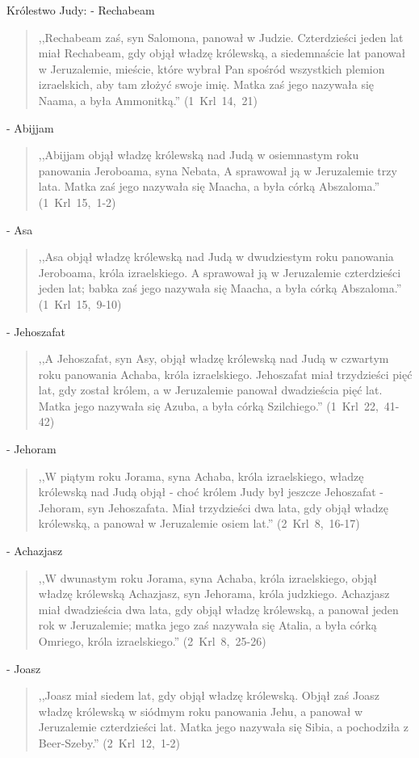 \documentclass[10pt,a4paper,oneside]{article}
\begin{document}
Królestwo Judy:
- Rechabeam
\begin{quote}
,,Rechabeam zaś, syn Salomona, panował w Judzie. Czterdzieści jeden lat miał Rechabeam, gdy objął władzę królewską, a siedemnaście lat panował w Jeruzalemie, mieście, które wybrał Pan spośród wszystkich plemion izraelskich, aby tam złożyć swoje imię. Matka zaś jego nazywała się Naama, a była Ammonitką.'' (1~Krl~14,~21)
\end{quote}
- Abijjam
\begin{quote}
,,Abijjam objął władzę królewską nad Judą w osiemnastym roku panowania Jeroboama, syna Nebata, A sprawował ją w Jeruzalemie trzy lata. Matka zaś jego nazywała się Maacha, a była córką Abszaloma.'' (1~Krl~15,~1-2)
\end{quote}
- Asa
\begin{quote}
,,Asa objął władzę królewską nad Judą w dwudziestym roku panowania Jeroboama, króla izraelskiego. A sprawował ją w Jeruzalemie czterdzieści jeden lat; babka zaś jego nazywała się Maacha, a była córką Abszaloma.'' (1~Krl~15,~9-10)
\end{quote}
- Jehoszafat
\begin{quote}
,,A Jehoszafat, syn Asy, objął władzę królewską nad Judą w czwartym roku panowania Achaba, króla izraelskiego. Jehoszafat miał trzydzieści pięć lat, gdy został królem, a w Jeruzalemie panował dwadzieścia pięć lat. Matka jego nazywała się Azuba, a była córką Szilchiego.'' (1~Krl~22,~41-42)
\end{quote}
- Jehoram
\begin{quote}
,,W piątym roku Jorama, syna Achaba, króla izraelskiego, władzę królewską nad Judą objął - choć królem Judy był jeszcze Jehoszafat - Jehoram, syn Jehoszafata. Miał trzydzieści dwa lata, gdy objął władzę królewską, a panował w Jeruzalemie osiem lat.'' (2~Krl~8,~16-17)
\end{quote}
- Achazjasz
\begin{quote}
,,W dwunastym roku Jorama, syna Achaba, króla izraelskiego, objął władzę królewską Achazjasz, syn Jehorama, króla judzkiego. Achazjasz miał dwadzieścia dwa lata, gdy objął władzę królewską, a panował jeden rok w Jeruzalemie; matka jego zaś nazywała się Atalia, a była córką Omriego, króla izraelskiego.'' (2~Krl~8,~25-26)
\end{quote}
- Joasz
\begin{quote}
,,Joasz miał siedem lat, gdy objął władzę królewską. Objął zaś Joasz władzę królewską w siódmym roku panowania Jehu, a panował w Jeruzalemie czterdzieści lat. Matka jego nazywała się Sibia, a pochodziła z Beer-Szeby.'' (2~Krl~12,~1-2)
\end{quote}
\end{document}
